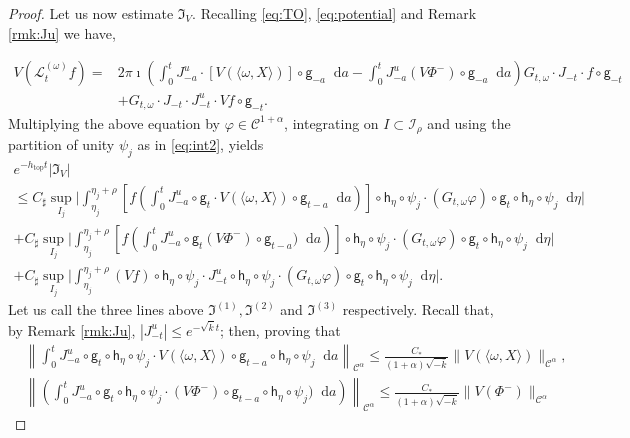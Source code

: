 \documentclass[11pt,letterpaper]{amsart}
\newcommand \cI {{\mathcal I}}
\newcommand \cL {{\mathcal L}}
\newcommand \cC {{\mathscr{C}}}
\newcommand \sC {{C_\sharp}}
\newcommand{\horo}{\mathsf{h}}
\newcommand{\geo}{\mathsf{g}}
\newcommand*{\diff}{\mathop{}\!\mathrm{d}}
\DeclareMathOperator{\topp}{top}
\theoremstyle{definition}
\begin{document}
\begin{proof}
Let us now estimate $\mathfrak I_V$. Recalling \eqref{eq:TO}, \eqref{eq:potential} and Remark \ref{rmk:Ju} we have,

\[
\begin{split}
V(\cL^{(\omega)}_tf)=&2\pi \imath\left(\int_0^t J^u_{-a}\cdot [V(\langle \omega, X \rangle)]\circ \geo_{-a}\diff a-\int_0^t J^u_{-a} (V{\Phi^-})\circ \geo_{-a}\diff a\right)G_{t,\omega}\cdot J_{-t}\cdot f\circ\geo_{-t} \\
%
&+G_{t,\omega} \cdot J_{-t}\cdot J^u_{-t}\cdot  Vf\circ \geo_{-t}.
\end{split}
\]
Multiplying the above equation by $\varphi\in \cC^{1+\alpha}$, integrating on $I\subset \cI_\rho$ and using the partition of unity $\psi_j$ as in \eqref{eq:int2}, yields
\begin{multline*}
e^{-h_{\topp}t}|\mathfrak I_V | \\
%
\le \sC\sup_{I_j} \bigg|  \int_{\eta_j}^{\eta_j+\rho} \left[ f\left(\int_0^t J^u_{-a}\circ \geo_t\cdot V(\langle \omega, X \rangle) \circ \geo_{t-a} \diff a\right)\right]\circ \horo_\eta\circ \psi_j\cdot (G_{t,\omega}\varphi)\circ \geo_t\circ \horo_\eta\circ \psi_j\diff \eta \bigg|  \\
%
+ \sC\sup_{I_j} \bigg|\int_{\eta_j}^{\eta_j+\rho} \left[ f\left(\int_0^t J^u_{-a}\circ \geo_t (V{\Phi^-})\circ \geo_{t-a}) \diff a\right)\right]\circ \horo_\eta\circ \psi_j\cdot (G_{t,\omega}\varphi)\circ \geo_t\circ \horo_\eta\circ \psi_j \diff \eta \bigg| \\
%
+\sC\sup_{I_j} \bigg| \int_{\eta_j}^{\eta_j+\rho} (Vf)\circ \horo_\eta\circ \psi_j \cdot J^u_{-t}\circ\horo_\eta\circ \psi_j \cdot (G_{t,\omega}\varphi)\circ \geo_t\circ \horo_\eta\circ \psi_j \diff \eta \bigg|.
\end{multline*}
Let us call the three lines above $\mathfrak I^{(1)},\mathfrak I^{(2)}$ and $\mathfrak I^{(3)}$ respectively. Recall that, by Remark \ref{rmk:Ju}, $|J_{-t}^u|\le e^{-\sqrt{\overline k}t}$; then, proving that
\[
\begin{split}
&\left\| \int_0^t J^u_{-a}\circ \geo_t \circ \horo_\eta\circ \psi_j\cdot V(\langle \omega, X \rangle)\circ \geo_{t-a} \circ \horo_\eta\circ \psi_j\diff a \right\|_{\cC^\alpha}  \le \frac{C_*}{(1+\alpha) \sqrt{-\overline k}}\|V(\langle \omega, X \rangle)\|_{\cC^\alpha},\\
%
&\left\|\left(\int_0^t J^u_{-a}\circ \geo_t \circ \horo_\eta\circ \psi_j\cdot (V{\Phi^-})\circ \geo_{t-a}\circ \horo_\eta\circ \psi_j) \diff a\right)\right\|_{\cC^\alpha}\le \frac{C_*}{(1+\alpha) \sqrt{-\overline k}}\|V({\Phi^-})\|_{\cC^\alpha}

\end{split}\]
\end{proof}
\end{document}
